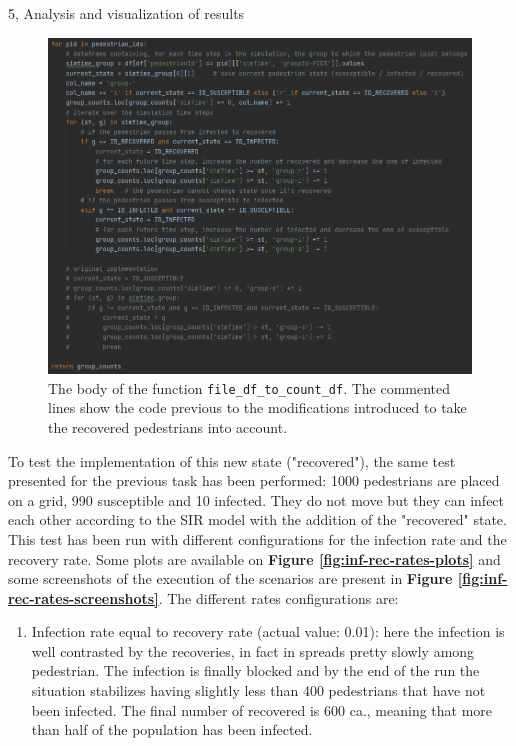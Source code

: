 \documentclass[10pt,a4paper]{article}
\begin{document}
\begin{task}{5, Analysis and visualization of results}
\begin{figure}[H]
    \centering
    \includegraphics[scale=0.75]{images/file_df_to_count_df.png}
    \caption{The body of the function \texttt{file\_df\_to\_count\_df}.
    The commented lines show the code previous to the modifications introduced to take the recovered pedestrians into account.}
    \label{fig:file_df_to_count_df}
\end{figure}

To test the implementation of this new state ("recovered"), the same test presented for the previous task has been performed:
1000 pedestrians are placed on a grid, 990 susceptible and 10 infected.
They do not move but they can infect each other according to the SIR model with the addition of the "recovered" state.\\
This test has been run with different configurations for the infection rate and the recovery rate.
Some plots are available on \textbf{Figure \ref{fig:inf-rec-rates-plots}} and some screenshots of the execution of the scenarios are present in \textbf{Figure \ref{fig:inf-rec-rates-screenshots}}.
The different rates configurations are:
\begin{enumerate}
    \item Infection rate equal to recovery rate (actual value: 0.01):
    here the infection is well contrasted by the recoveries, in fact in spreads pretty slowly among pedestrian.
    The infection is finally blocked and by the end of the run the situation stabilizes having slightly less than 400 pedestrians that have not been infected.
    The final number of recovered is 600 ca., meaning that more than half of the population has been infected.
    

\end{enumerate}
\end{task}
\end{document}
